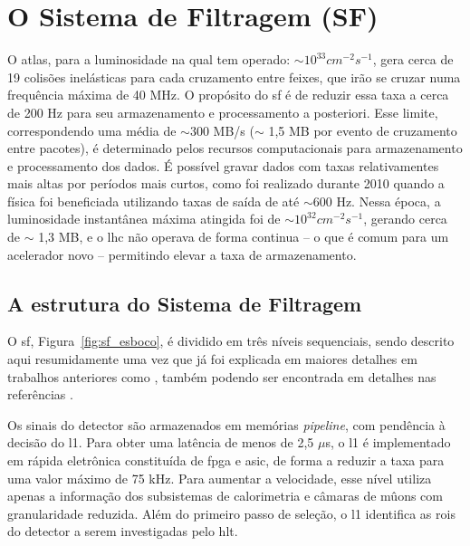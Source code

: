 \section{O Sistema de Filtragem (SF)}
\label{sec:sf}


O \gls{atlas}, para a luminosidade na qual tem operado: $\sim10^{33}cm^{-2}s^{-1}$,
gera cerca de 19 colisões inelásticas para cada cruzamento entre
feixes, que irão se cruzar numa frequência máxima de 40 MHz. O propósito do
\gls{sf} \cite{trigger_perf_2010,trigger_tdr} é de reduzir essa taxa a cerca
de 200 Hz para seu armazenamento e processamento a posteriori. Esse
limite, correspondendo uma média de $\sim$300 MB/s ($\sim$ 1,5 MB por evento de
cruzamento entre pacotes), é determinado pelos recursos
computacionais para armazenamento e processamento dos dados. É possível gravar
dados com taxas relativamentes mais altas por períodos mais curtos, como foi
realizado durante 2010 quando a física foi beneficiada utilizando taxas de saída
de até $\sim$600 Hz. Nessa época, a luminosidade instantânea máxima atingida foi de
$\sim10^{32}cm^{-2}s^{-1}$, gerando cerca de $\sim$ 1,3 MB, e o \gls{lhc} não 
operava de forma continua -- o que é comum para um acelerador novo -- permitindo 
elevar a taxa de armazenamento.

\subsection{A estrutura do Sistema de Filtragem}
\label{ssec:estru_sf}

O \gls{sf}, Figura~\ref{fig:sf_esboco}, é dividido em três níveis sequenciais,
sendo descrito aqui resumidamente uma vez que já foi explicada em maiores detalhes em
trabalhos anteriores como \cite{tese_eduardo,tese_torres}, também podendo ser encontrada 
em detalhes nas referências \cite{trigger_tdr,l1_trigger_tdr,l2_ef_daq_dcs_tdr,trigger_perfomance}.

Os sinais do detector são armazenados em memórias \emph{pipeline}, com pendência
à decisão do \acrshort{l1}. Para obter uma latência de menos de 2,5 $\mu$s, 
o \gls{l1} é implementado em rápida eletrônica constituída de \gls{fpga} e
\gls{asic}, de forma a reduzir a taxa para uma valor máximo de 75 kHz. Para
aumentar a velocidade, esse nível utiliza apenas a informação dos subsistemas de
calorimetria e câmaras de mûons com granularidade reduzida. Além do
primeiro passo de seleção, o \gls{l1} identifica as \glspl{roi} do detector a
serem investigadas pelo \acrshort{hlt}. 


